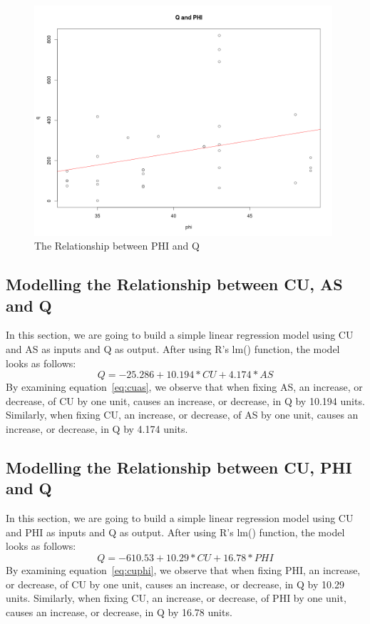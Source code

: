 \documentclass[a4paper,12pt, english]{article}
\begin{document}
\begin{figure}[htp!]
  \centering
  \includegraphics[width=0.986\textwidth]{phi-line}
  \caption{The Relationship between PHI and Q}
  \label{fig:phi-line}
\end{figure}


\subsection{Modelling the Relationship between CU, AS and Q} 
In this section, we are going to build a simple linear regression model using CU and AS as inputs and Q as output. After using R's lm() function, the model looks as follows:\\
\begin{equation}
\label{eq:cuas}
Q = -25.286   +    10.194*CU +       4.174*AS
\end{equation}       
By examining equation~\ref{eq:cuas}, we observe that when fixing AS, an increase, or decrease, of CU by one unit, causes an increase, or decrease, in Q by 10.194 units.
Similarly, when fixing CU, an increase, or decrease, of AS by one unit, causes an increase, or decrease, in Q by 4.174 units.


\subsection{Modelling the Relationship between CU, PHI and Q} 
In this section, we are going to build a simple linear regression model using CU and PHI as inputs and Q as output. After using R's lm() function, the model looks as follows:\\
\begin{equation}
\label{eq:cuphi}
Q = -610.53  +     10.29*CU   +     16.78*PHI
\end{equation}       
By examining equation~\ref{eq:cuphi}, we observe that when fixing PHI, an increase, or decrease, of CU by one unit, causes an increase, or decrease, in Q by 10.29 units.
Similarly, when fixing CU, an increase, or decrease, of PHI by one unit, causes an increase, or decrease, in Q by 16.78 units.
\end{document}
